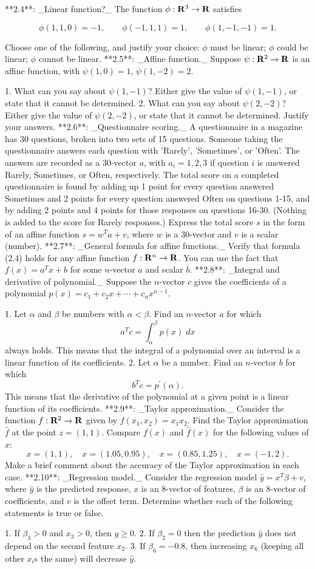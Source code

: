 

**2.4**: _Linear function?_ The function \(\phi:{\bf R}^{3}\to{\bf R}\) satisfies

\[\phi(1,1,0)=-1,\qquad\phi(-1,1,1)=1,\qquad\phi(1,-1,-1)=1.\]

Choose one of the following, and justify your choice: \(\phi\) must be linear; \(\phi\) could be linear; \(\phi\) cannot be linear.
**2.5**: _Affine function._ Suppose \(\psi:{\bf R}^{2}\to{\bf R}\) is an affine function, with \(\psi(1,0)=1\), \(\psi(1,-2)=2\).

1. What can you say about \(\psi(1,-1)\)? Either give the value of \(\psi(1,-1)\), or state that it cannot be determined.
2. What can you say about \(\psi(2,-2)\)? Either give the value of \(\psi(2,-2)\), or state that it cannot be determined. Justify your answers.
**2.6**: _Questionnaire scoring._ A questionnaire in a magazine has 30 questions, broken into two sets of 15 questions. Someone taking the questionnaire answers each question with 'Rarely', 'Sometimes', or 'Often'. The answers are recorded as a 30-vector \(a\), with \(a_{i}=1,2,3\) if question \(i\) is answered Rarely, Sometimes, or Often, respectively. The total score on a completed questionnaire is found by adding up 1 point for every question answered Sometimes and 2 points for every question answered Often on questions 1-15, and by adding 2 points and 4 points for those responses on questions 16-30. (Nothing is added to the score for Rarely responses.) Express the total score \(s\) in the form of an affine function \(s=w^{T}a+v\), where \(w\) is a 30-vector and \(v\) is a scalar (number).
**2.7**: _General formula for affine functions._ Verify that formula (2.4) holds for any affine function \(f:{\bf R}^{n}\to{\bf R}\). You can use the fact that \(f(x)=a^{T}x+b\) for some \(n\)-vector \(a\) and scalar \(b\).
**2.8**: _Integral and derivative of polynomial._ Suppose the \(n\)-vector \(c\) gives the coefficients of a polynomial \(p(x)=c_{1}+c_{2}x+\cdots+c_{n}x^{n-1}\).

1. Let \(\alpha\) and \(\beta\) be numbers with \(\alpha<\beta\). Find an \(n\)-vector \(a\) for which \[a^{T}c=\int_{\alpha}^{\beta}p(x)\;dx\] always holds. This means that the integral of a polynomial over an interval is a linear function of its coefficients.
2. Let \(\alpha\) be a number. Find an \(n\)-vector \(b\) for which \[b^{T}c=p^{\prime}(\alpha).\] This means that the derivative of the polynomial at a given point is a linear function of its coefficients.
**2.9**: _Taylor approximation._ Consider the function \(f:{\bf R}^{2}\to{\bf R}\) given by \(f(x_{1},x_{2})=x_{1}x_{2}\). Find the Taylor approximation \(\hat{f}\) at the point \(z=(1,1)\). Compare \(f(x)\) and \(\hat{f}(x)\) for the following values of \(x\): \[x=(1,1),\quad x=(1.05,0.95),\quad x=(0.85,1.25),\quad x=(-1,2).\] Make a brief comment about the accuracy of the Taylor approximation in each case.
**2.10**: _Regression model._ Consider the regression model \(\hat{y}=x^{T}\beta+v\), where \(\hat{y}\) is the predicted response, \(x\) is an 8-vector of features, \(\beta\) is an 8-vector of coefficients, and \(v\) is the offset term. Determine whether each of the following statements is true or false.

1. If \(\beta_{3}>0\) and \(x_{3}>0\), then \(\hat{y}\geq 0\).
2. If \(\beta_{2}=0\) then the prediction \(\hat{y}\) does not depend on the second feature \(x_{2}\).
3. If \(\beta_{6}=-0.8\), then increasing \(x_{6}\) (keeping all other \(x_{i}\)s the same) will decrease \(\hat{y}\).

